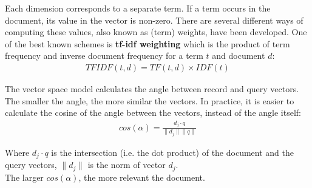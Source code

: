 \documentclass{report}
\begin{document}
Each dimension corresponds to a separate term.
If a term occurs in the document, its value in the vector is non-zero.
There are several different ways of computing these values, also known as (term) weights, have been developed. One of the best known schemes is {\bf tf-idf weighting} which is the product of term frequency and inverse document frequency for a term $t$ and document $d$:
\begin{align*}
TFIDF(t, d) = TF(t, d) \times IDF(t)
\end{align*}

The vector space model calculates the angle between record and query vectors. The smaller the angle, the more similar the vectors.
In practice, it is easier to calculate the cosine of the angle between the vectors, instead of the angle itself:
\begin{align*}
cos(\alpha) = \frac{d_j \cdot q}{\lVert d_j \rVert \lVert q \rVert}
\end{align*}

Where $d_j \cdot q$ is the intersection (i.e. the dot product) of the document and the query vectors, $\lVert d_j \rVert$ is the norm of vector $d_j$. \\
The larger $cos(\alpha)$, the more relevant the document.
\end{document}

